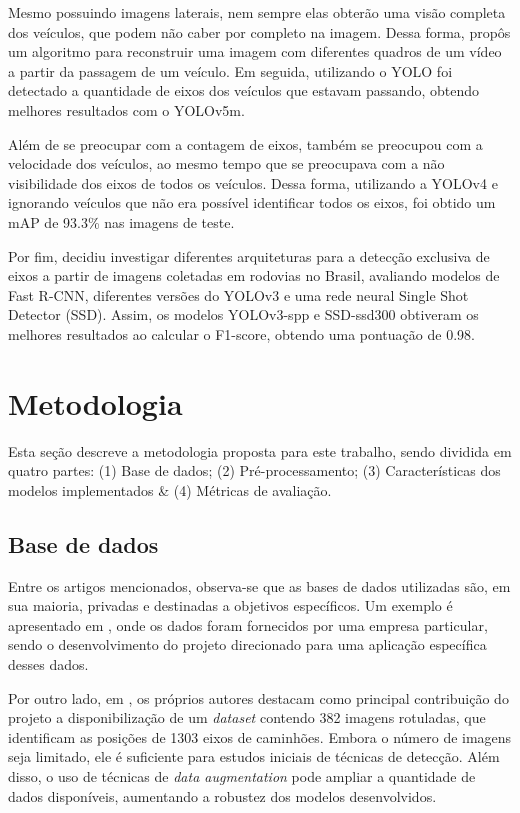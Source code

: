 \documentclass[12pt]{article}
\begin{document}
    Mesmo possuindo imagens laterais, nem sempre elas obterão uma visão completa dos veículos, que podem não caber por completo na imagem. Dessa forma, \cite{Souza2024} propôs um algoritmo para reconstruir uma imagem com diferentes quadros de um vídeo a partir da passagem de um veículo. Em seguida, utilizando o YOLO foi detectado a quantidade de eixos dos veículos que estavam passando, obtendo melhores resultados com o YOLOv5m.

    Além de se preocupar com a contagem de eixos, \cite{Miles2022} também se preocupou com a velocidade dos veículos, ao mesmo tempo que se preocupava com a não visibilidade dos eixos de todos os veículos. Dessa forma, utilizando a YOLOv4 e ignorando veículos que não era possível identificar todos os eixos, foi obtido um mAP de 93.3\% nas imagens de teste.

    Por fim, \cite{marcomini2023truckaxledetectionconvolutional} decidiu investigar diferentes arquiteturas para a detecção exclusiva de eixos a partir de imagens coletadas em rodovias no Brasil, avaliando modelos de Fast R-CNN, diferentes versões do YOLOv3 e uma rede neural Single Shot Detector (SSD). Assim, os modelos YOLOv3-spp e SSD-ssd300 obtiveram os melhores resultados ao calcular o F1-score, obtendo uma pontuação de 0.98.

\section{Metodologia}

    Esta seção descreve a metodologia proposta para este trabalho, sendo dividida em quatro partes: (1) Base de dados; (2) Pré-processamento; (3) Características dos modelos implementados \& (4) Métricas de avaliação. 

    \subsection{Base de dados}
        Entre os artigos mencionados, observa-se que as bases de dados utilizadas são, em sua maioria, privadas e destinadas a objetivos específicos. Um exemplo é apresentado em \cite{Miles2022}, onde os dados foram fornecidos por uma empresa particular, sendo o desenvolvimento do projeto direcionado para uma aplicação específica desses dados.
        
        Por outro lado, em \cite{marcomini2023truckaxledetectionconvolutional}, os próprios autores destacam como principal contribuição do projeto a disponibilização de um \textit{dataset} contendo 382 imagens rotuladas, que identificam as posições de 1303 eixos de caminhões. Embora o número de imagens seja limitado, ele é suficiente para estudos iniciais de técnicas de detecção. Além disso, o uso de técnicas de \textit{data augmentation} pode ampliar a quantidade de dados disponíveis, aumentando a robustez dos modelos desenvolvidos.
        
\end{document}

